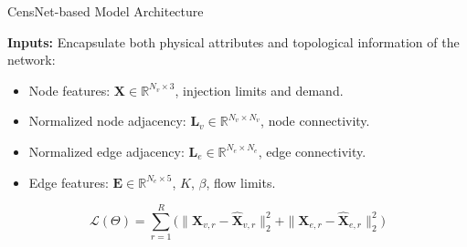 \documentclass[hyperref={colorlinks,citecolor=blue,linkcolor=blue,urlcolor=blue}]{beamer}
\begin{document}
\begin{frame}{CensNet-based Model Architecture}
\scriptsize
\justifying
    \centering
    \resizebox{0.9\textwidth}{!}{%
    } 

\vspace{0.2cm}
\textbf{Inputs:} Encapsulate both physical attributes and topological information of the network:
\begin{itemize}
    \item \footnotesize Node features: 
    \(\mathbf{X} \in \mathbb{R}^{N_v \times 3}\),  
    injection limits and demand. 
    
    \item \footnotesize Normalized node adjacency: 
    \(\mathbf{L}_v \in \mathbb{R}^{N_v \times N_v}\),  
    node connectivity. 
    
    \item \footnotesize Normalized edge adjacency: 
    \(\mathbf{L}_e \in \mathbb{R}^{N_e \times N_e}\),  
    edge connectivity. 
    
    \item \footnotesize Edge features: 
    \(\mathbf{E} \in \mathbb{R}^{N_e \times 5}\),  
    \(K\), \(\beta\), flow limits. 
\end{itemize}

\[
    \mathcal{L}(\Theta) = 
    \sum_{r=1}^{R} 
    \Big(
    \| \mathbf{X}_{v,r} - \hat{\mathbf{X}}_{v,r} \|_2^2 +
    \| \mathbf{X}_{e,r} - \hat{\mathbf{X}}_{e,r} \|_2^2
    \Big)
\]
\end{frame}
\end{document}
